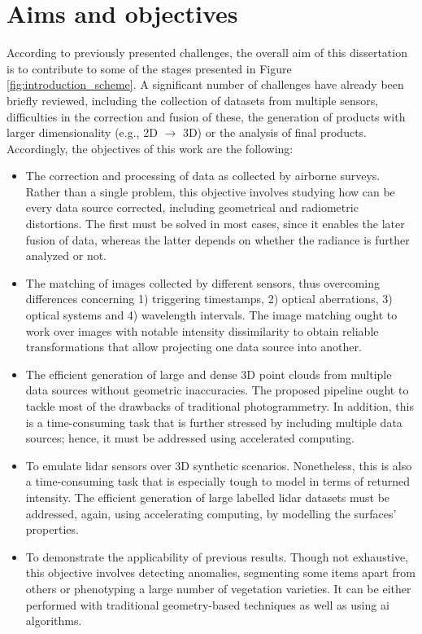 \section{Aims and objectives}

According to previously presented challenges, the overall aim of this dissertation is to contribute to some of the stages presented in Figure \ref{fig:introduction_scheme}. A significant number of challenges have already been briefly reviewed, including the collection of datasets from multiple sensors, difficulties in the correction and fusion of these, the generation of products with larger dimensionality (e.g., 2D $\rightarrow$ 3D) or the analysis of final products. Accordingly, the objectives of this work are the following:
\begin{itemize}
    \item The correction and processing of data as collected by airborne surveys. Rather than a single problem, this objective involves studying how can be every data source corrected, including geometrical and radiometric distortions. The first must be solved in most cases, since it enables the later fusion of data, whereas the latter depends on whether the radiance is further analyzed or not.
    \item The matching of images collected by different sensors, thus overcoming differences concerning 1) triggering timestamps, 2) optical aberrations, 3) optical systems and 4) wavelength intervals. The image matching ought to work over images with notable intensity dissimilarity to obtain reliable transformations that allow projecting one data source into another. 
    \item The efficient generation of large and dense 3D point clouds from multiple data sources without geometric inaccuracies. The proposed pipeline ought to tackle most of the drawbacks of traditional photogrammetry. In addition, this is a time-consuming task that is further stressed by including multiple data sources; hence, it must be addressed using accelerated computing.
    \item To emulate \acrshort{lidar} sensors over 3D synthetic scenarios. Nonetheless, this is also a time-consuming task that is especially tough to model in terms of returned intensity. The efficient generation of large labelled \acrshort{lidar} datasets must be addressed, again, using accelerating computing, by modelling the surfaces' properties.
    \item To demonstrate the applicability of previous results. Though not exhaustive, this objective involves detecting anomalies, segmenting some items apart from others or phenotyping a large number of vegetation varieties. It can be either performed with traditional geometry-based techniques as well as using \acrshort{ai} algorithms.
\end{itemize}

